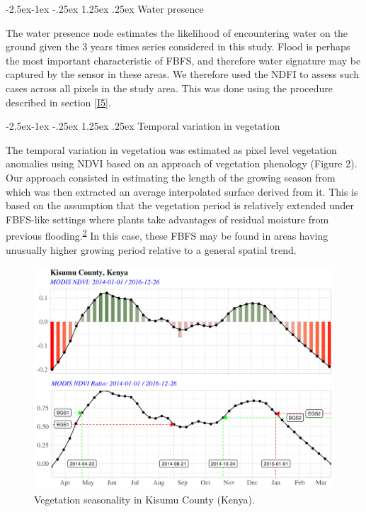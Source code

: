 \documentclass[12pt,oneside]{article}
\makeatletter
\renewcommand\paragraph{\@startsection{paragraph}{4}{\z@}%
            {-2.5ex\@plus -1ex \@minus -.25ex}%
            {1.25ex \@plus .25ex}%
            {\normalfont\normalsize\bfseries}}
\makeatother
\begin{document}
\hypertarget{I527}{%
\paragraph{Water presence}\label{I527}}

The water presence node estimates the likelihood of encountering water on the ground given the 3 years times series considered in this study. Flood is perhaps the most important characteristic of FBFS, and therefore water signature may be captured by the sensor in these areas. We therefore used the NDFI to assess such cases across all pixels in the study area. This was done using the procedure described in section \ref{I5}.

\hypertarget{I528}{%
\paragraph{Temporal variation in vegetation}\label{I528}}

The temporal variation in vegetation was estimated as pixel level vegetation anomalies using NDVI based on an approach of vegetation phenology (Figure 2). Our approach consisted in estimating the length of the growing season from which was then extracted an average interpolated surface derived from it. This is based on the assumption that the vegetation period is relatively extended under FBFS-like settings where plants take advantages of residual moisture from previous flooding.\textsuperscript{\protect\hyperlink{ref-VanSteenbergen_et_al_2010}{2}} In this case, these FBFS may be found in areas having unusually higher growing period relative to a general spatial trend.

\begin{figure}
\includegraphics[width=1\linewidth]{figures/Mapping_FBFS_vegetation_seasonality} \caption{Vegetation seasonality in Kisumu County (Kenya).}\label{fig:fig2}
\end{figure}
\end{document}
